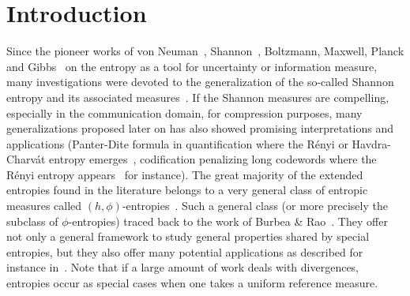 \documentclass[entropy,article,submit,moreauthors,pdftex]{Definitions/mdpi}
\begin{document}

\section{Introduction}
\label{sec:Intro}

Since  the  pioneer  works of  von  Neuman~\cite{vNeu27},  Shannon~\cite{Sha48},
Boltzmann, Maxwell, Planck and Gibbs~\cite{Bol64, Bol96, Bol98, Pla15, Nie52:v2,
  Jay65,  MulMul09} on  the entropy  as a  tool for  uncertainty or  information
measure, many investigations were devoted to the generalization of the so-called
Shannon entropy and its associated measures~\cite{Ren61, Var66, HavCha67, Csi67,
  Dar70, AczDar75,  DarJar79, Tsa88,  Sal87, SalMen93, Sal94,  LieVaj06, Bas13}.
If the Shannon measures are  compelling, especially in the communication domain,
for compression purposes, many generalizations proposed later on has also showed
promising   interpretations    and   applications   (Panter-Dite    formula   in
quantification    where     the    R\'enyi    or     Havdra-Charv\'at    entropy
emerges~\cite{PanDit51, Llo82, GerGra92}, codification penalizing long codewords
where the R\'enyi entropy appears~\cite{Cam65,  Ber09} for instance).  The great
majority of  the extended entropies  found in the  literature belongs to  a very
general  class  of  entropic measures  called  $(h,\phi)$-entropies~\cite{Csi67,
  BurRao82, SalMen93,  Sal94, MenMor97, Par06}.   Such a general class  (or more
precisely the subclass of $\phi$-entropies) traced back to the work of Burbea \&
Rao~\cite{BurRao82}. They  offer not only  a general framework to  study general
properties  shared by  special entropies,  but  they also  offer many  potential
applications as  described for instance  in~\cite{Par06}.  Note that if  a large
amount of work deals with divergences, entropies occur as special cases when one
takes a uniform reference measure.
\end{document}
